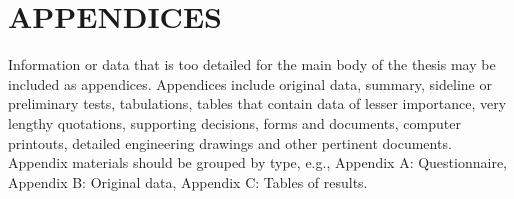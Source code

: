 \chapter{APPENDICES}
Information or data that is too detailed for the main body of the thesis may be included as appendices. Appendices include original data, summary, sideline or preliminary tests, tabulations, tables that contain data of lesser importance, very lengthy quotations, supporting decisions, forms and documents, computer printouts, detailed engineering drawings and other pertinent documents. Appendix materials should be grouped by type, e.g., Appendix A: Questionnaire, Appendix B: Original data, Appendix C: Tables of results.